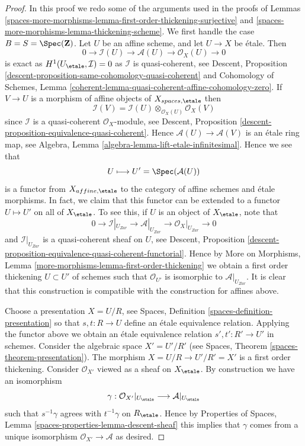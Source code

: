 \begin{proof}
In this proof we redo some of the arguments used in the
proofs of
Lemmas \ref{spaces-more-morphisms-lemma-first-order-thickening-surjective} and
\ref{spaces-more-morphisms-lemma-thickening-scheme}.
We first handle the case $B = S = \Spec(\mathbf{Z})$.
Let $U$ be an affine scheme, and let $U \to X$ be \'etale.
Then
$$
0 \to \mathcal{I}(U) \to \mathcal{A}(U) \to \mathcal{O}_X(U) \to 0
$$
is exact as $H^1(U_\etale, \mathcal{I}) = 0$ as
$\mathcal{I}$ is quasi-coherent, see
Descent, Proposition \ref{descent-proposition-same-cohomology-quasi-coherent}
and Cohomology of Schemes, Lemma
\ref{coherent-lemma-quasi-coherent-affine-cohomology-zero}.
If $V \to U$ is a morphism of affine objects of $X_{spaces, \etale}$
then
$$
\mathcal{I}(V) = \mathcal{I}(U) \otimes_{\mathcal{O}_X(U)} \mathcal{O}_X(V)
$$
since $\mathcal{I}$ is a quasi-coherent $\mathcal{O}_X$-module, see
Descent, Proposition \ref{descent-proposition-equivalence-quasi-coherent}.
Hence $\mathcal{A}(U) \to \mathcal{A}(V)$ is an
\'etale ring map, see
Algebra, Lemma \ref{algebra-lemma-lift-etale-infinitesimal}.
Hence we see that
$$
U \longmapsto U' = \Spec(\mathcal{A}(U))
$$
is a functor from $X_{affine, \etale}$ to the category of affine
schemes and \'etale morphisms. In fact, we claim that this functor can
be extended to a functor $U \mapsto U'$ on all of $X_\etale$.
To see this, if $U$ is an object of $X_\etale$, note that
$$
0 \to \mathcal{I}|_{U_{Zar}} \to \mathcal{A}|_{U_{Zar}} \to
\mathcal{O}_X|_{U_{Zar}} \to 0
$$
and $\mathcal{I}|_{U_{Zar}}$ is a quasi-coherent sheaf on $U$, see
Descent,
Proposition \ref{descent-proposition-equivalence-quasi-coherent-functorial}.
Hence by
More on Morphisms, Lemma \ref{more-morphisms-lemma-first-order-thickening}
we obtain a first order thickening $U \subset U'$ of schemes such that
$\mathcal{O}_{U'}$ is isomorphic to $\mathcal{A}|_{U_{Zar}}$. It is clear that
this construction is compatible with the construction for affines above.

\medskip\noindent
Choose a presentation $X = U/R$, see
Spaces, Definition \ref{spaces-definition-presentation}
so that $s, t : R \to U$ define an \'etale equivalence relation.
Applying the functor above we obtain an \'etale equivalence
relation $s', t' : R' \to U'$ in schemes. Consider the algebraic space
$X' = U'/R'$ (see
Spaces, Theorem \ref{spaces-theorem-presentation}).
The morphism $X = U/R \to U'/R' = X'$ is a first order thickening.
Consider $\mathcal{O}_{X'}$ viewed as a sheaf on $X_\etale$.
By construction we have an isomorphism
$$
\gamma :
\mathcal{O}_{X'}|_{U_\etale}
\longrightarrow
\mathcal{A}|_{U_\etale}
$$
such that $s^{-1}\gamma$ agrees with $t^{-1}\gamma$ on $R_\etale$.
Hence by
Properties of Spaces, Lemma \ref{spaces-properties-lemma-descent-sheaf}
this implies that $\gamma$ comes from a unique isomorphism
$\mathcal{O}_{X'} \to \mathcal{A}$ as desired.


\end{proof}
